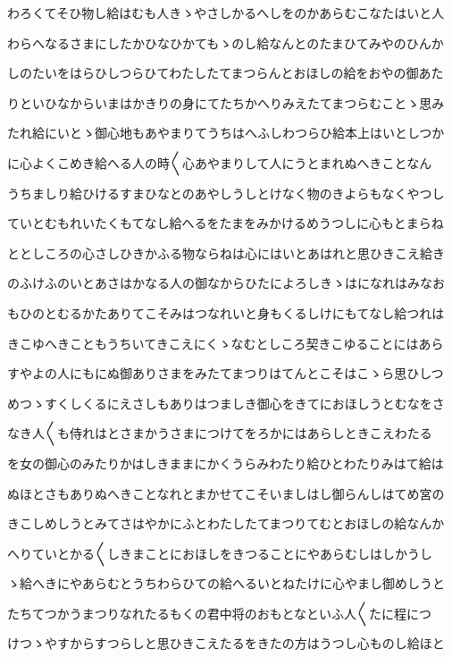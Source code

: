 \documentclass[a4paper,11pt,landscape]{ltjtarticle}
\begin{document}
わろくてそひ物し給はむも人きゝやさしかるへしをのかあらむこなたはいと人
\par\medskip
わらへなるさまにしたかひなひかてもゝのし給なんとのたまひてみやのひんか
\par\medskip
しのたいをはらひしつらひてわたしたてまつらんとおほしの給をおやの御あた
\par\medskip
りといひなからいまはかきりの身にてたちかへりみえたてまつらむことゝ思み
\par\medskip
たれ給にいとゝ御心地もあやまりてうちはへふしわつらひ給本上はいとしつか
\par\medskip
に心よくこめき給へる人の時〱心あやまりして人にうとまれぬへきことなん
\par\medskip
うちましり給ひけるすまひなとのあやしうしとけなく物のきよらもなくやつし
\par\medskip
ていとむもれいたくもてなし給へるをたまをみかけるめうつしに心もとまらね
\par\medskip
ととしころの心さしひきかふる物ならねは心にはいとあはれと思ひきこえ給き
\par\medskip
のふけふのいとあさはかなる人の御なからひたによろしきゝはになれはみなお
\par\medskip
もひのとむるかたありてこそみはつなれいと身もくるしけにもてなし給つれは
\par\medskip
きこゆへきこともうちいてきこえにくゝなむとしころ契きこゆることにはあら
\par\medskip
すやよの人にもにぬ御ありさまをみたてまつりはてんとこそはこゝら思ひしつ
\par\medskip
めつゝすくしくるにえさしもありはつましき御心をきてにおほしうとむなをさ
\par\medskip
なき人〱も侍れはとさまかうさまにつけてをろかにはあらしときこえわたる
\par\medskip
を女の御心のみたりかはしきままにかくうらみわたり給ひとわたりみはて給は
\par\medskip
ぬほとさもありぬへきことなれとまかせてこそいましはし御らんしはてめ宮の
\par\medskip
きこしめしうとみてさはやかにふとわたしたてまつりてむとおほしの給なんか
\par\medskip
へりていとかる〱しきまことにおほしをきつることにやあらむしはしかうし
\par\medskip
ゝ給へきにやあらむとうちわらひての給へるいとねたけに心やまし御めしうと
\par\medskip
たちてつかうまつりなれたるもくの君中将のおもとなといふ人〱たに程につ
\par\medskip
けつゝやすからすつらしと思ひきこえたるをきたの方はうつし心ものし給ほと
\end{document}

